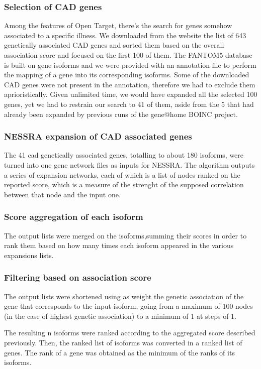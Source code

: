 \documentclass[fleqn,10pt]{SelfArx} %
\begin{document}
\subsubsection{Selection of CAD genes}
Among the features of Open Target, there's the search for genes somehow associated to a specific illness. 
We downloaded from the website the list of 643 genetically associated CAD genes and sorted them based on the overall association score and focused on the first 100 of them. 
The FANTOM5 database is built on gene isoforms and we were provided with an annotation file to perform the mapping of a gene into its corresponding isoforms.
Some of the downloaded CAD genes were not present in the annotation, therefore we had to exclude them aprioristically.
Given unlimited time, we would have expanded all the selected 100 genes, yet we had to restrain our search to 41 of them, aside from the 5 that had already been expanded by previous runs of the gene@home BOINC project.

\subsubsection{NESSRA expansion of CAD associated genes}
The 41 cad genetically associated genes, totalling to about 180 isoforms, were turned into one gene network files as inputs for NESSRA.
The algorithm outputs a series of expansion networks, each of which is a list of nodes ranked on the reported score, which is a measure of the strenght of the supposed correlation between that node and the input one. 

\subsubsection{Score aggregation of each isoform}
The output lists were merged on the isoforms,summing their scores in order to rank them based on how many times each isoform appeared in the various expansions lists.

\subsubsection{Filtering based on association score}
The output lists were shortened using as weight the genetic association of the gene that corresponds to the input isoform, going from a maximum of 100 nodes (in the case of highest genetic association) to a minimum of 1 at steps of 1. 

The resulting n isoforms were ranked according to the aggregated score described previously. Then, the ranked list of isoforms was converted in a ranked list of genes. The rank of a gene was obtained as the minimum of the ranks of its isoforms. 
\end{document}
